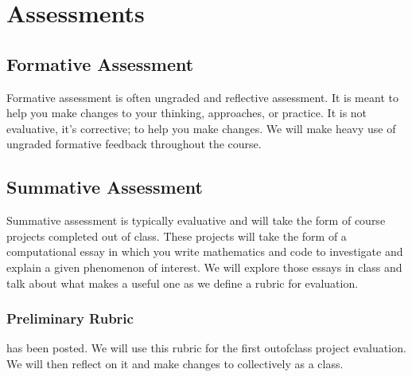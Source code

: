 \documentclass[letterpaper,10pt,english]{jupyterBook}
\begin{document}
\sphinxAtStartPar
{}

\sphinxAtStartPar
{}

\sphinxAtStartPar
{}

\sphinxAtStartPar
{}

\sphinxAtStartPar
{}

\sphinxstepscope


\section{Assessments}
\label{\detokenize{content/0_course/assessments:assessments}}\label{\detokenize{content/0_course/assessments::doc}}

\subsection{Formative Assessment}
\label{\detokenize{content/0_course/assessments:formative-assessment}}
\sphinxAtStartPar
Formative assessment is often ungraded and reflective assessment. It is meant to help you make changes to your thinking, approaches, or practice. It is not evaluative, it’s corrective; to help you make changes. We will make heavy use of ungraded formative feedback throughout the course.


\subsection{Summative Assessment}
\label{\detokenize{content/0_course/assessments:summative-assessment}}
\sphinxAtStartPar
Summative assessment is typically evaluative and will take the form of course projects completed out of class. These projects will take the form of a computational essay in which you write mathematics and code to investigate and explain a given phenomenon of interest. We will explore those essays in class and talk about what makes a useful one as we define a rubric for evaluation.


\subsubsection{Preliminary Rubric}
\label{\detokenize{content/0_course/assessments:preliminary-rubric}}
\sphinxAtStartPar
{\hyperref[\detokenize{content/0_course/rubric::doc}]{}} has been posted. We will use this rubric for the first out\sphinxhyphen{}of\sphinxhyphen{}class project evaluation. We will then reflect on it and make changes to collectively as a class.
\end{document}
